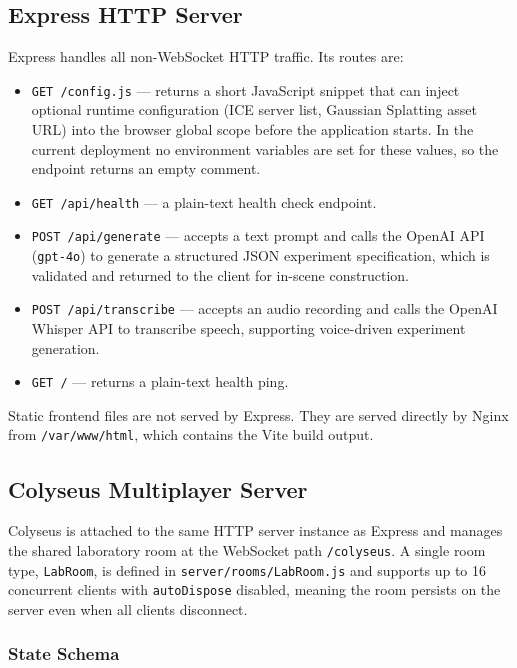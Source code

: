 \subsection{Express HTTP Server}
\label{sec:express_server}

Express handles all non-WebSocket HTTP traffic. Its routes are:

\begin{itemize}
  \item \texttt{GET /config.js} --- returns a short JavaScript snippet
        that can inject optional runtime configuration (ICE server list,
        Gaussian Splatting asset URL) into the browser global scope before
        the application starts. In the current deployment no environment
        variables are set for these values, so the endpoint returns an
        empty comment.
  \item \texttt{GET /api/health} --- a plain-text health check endpoint.
  \item \texttt{POST /api/generate} --- accepts a text prompt and calls
        the OpenAI API (\texttt{gpt-4o}) to generate a structured JSON
        experiment specification, which is validated and returned to the
        client for in-scene construction.
  \item \texttt{POST /api/transcribe} --- accepts an audio recording and
        calls the OpenAI Whisper API to transcribe speech, supporting
        voice-driven experiment generation.
  \item \texttt{GET /} --- returns a plain-text health ping.
\end{itemize}

Static frontend files are not served by Express. They are served directly
by Nginx from \texttt{/var/www/html}, which contains the Vite build output.

\subsection{Colyseus Multiplayer Server}
\label{sec:colyseus_server}

Colyseus is attached to the same HTTP server instance as Express and
manages the shared laboratory room at the WebSocket path
\texttt{/colyseus}. A single room type, \texttt{LabRoom}, is defined in
\texttt{server/rooms/LabRoom.js} and supports up to 16 concurrent clients
with \texttt{autoDispose} disabled, meaning the room persists on the
server even when all clients disconnect.

\subsubsection{State Schema}

